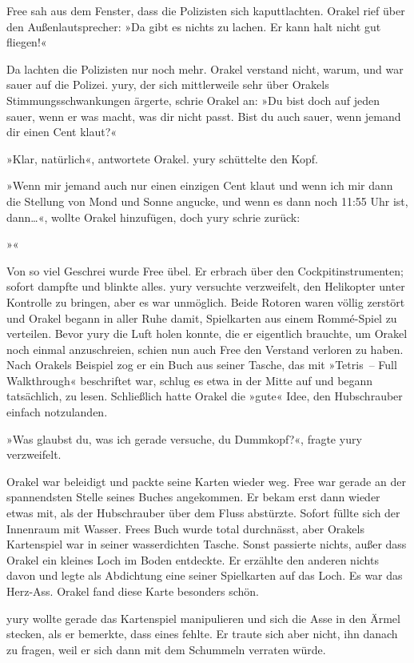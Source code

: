 Free sah aus dem Fenster, dass die Polizisten sich kaputtlachten. Orakel rief über den Außenlautsprecher: »Da gibt es nichts zu lachen. Er kann halt nicht gut fliegen!«

Da lachten die Polizisten nur noch mehr. Orakel verstand nicht, warum, und war sauer auf die Polizei. yury, der sich mittlerweile sehr über Orakels Stimmungsschwankungen ärgerte, schrie Orakel an: »Du bist doch auf jeden sauer, wenn er was macht, was dir nicht passt. Bist du auch sauer, wenn jemand dir einen Cent klaut?«

»Klar, natürlich«, antwortete Orakel. yury schüttelte den Kopf.

»Wenn mir jemand auch nur einen einzigen Cent klaut und wenn ich mir dann die Stellung von Mond und Sonne angucke, und wenn es dann noch 11:55 Uhr ist, dann…«, wollte Orakel hinzufügen, doch yury schrie zurück:

»«

Von so viel Geschrei wurde Free übel. Er erbrach über den Cockpitinstrumenten; sofort dampfte und blinkte alles. yury versuchte verzweifelt, den Helikopter unter Kontrolle zu bringen, aber es war unmöglich. Beide Rotoren waren völlig zerstört und Orakel begann in aller Ruhe damit, Spielkarten aus einem Rommé-Spiel zu verteilen. Bevor yury die Luft holen konnte, die er eigentlich brauchte, um Orakel noch einmal anzuschreien, schien nun auch Free den Verstand verloren zu haben. Nach Orakels Beispiel zog er ein Buch aus seiner Tasche, das mit »Tetris~– Full Walkthrough« beschriftet war, schlug es etwa in der Mitte auf und begann tatsächlich, zu lesen. Schließlich hatte Orakel die »gute« Idee, den Hubschrauber einfach notzulanden.

»Was glaubst du, was ich gerade versuche, du Dummkopf?«, fragte yury verzweifelt.

Orakel war beleidigt und packte seine Karten wieder weg. Free war gerade an der spannendsten Stelle seines Buches angekommen. Er bekam erst dann wieder etwas mit, als der Hubschrauber über dem Fluss abstürzte. Sofort füllte sich der Innenraum mit Wasser. Frees Buch wurde total durchnässt, aber Orakels Kartenspiel war in seiner wasserdichten Tasche. Sonst passierte nichts, außer dass Orakel ein kleines Loch im Boden entdeckte. Er erzählte den anderen nichts davon und legte als Abdichtung eine seiner Spielkarten auf das Loch. Es war das Herz-Ass. Orakel fand diese Karte besonders schön.

yury wollte gerade das Kartenspiel manipulieren und sich die Asse in den Ärmel stecken, als er bemerkte, dass eines fehlte. Er traute sich aber nicht, ihn danach zu fragen, weil er sich dann mit dem Schummeln verraten würde.


